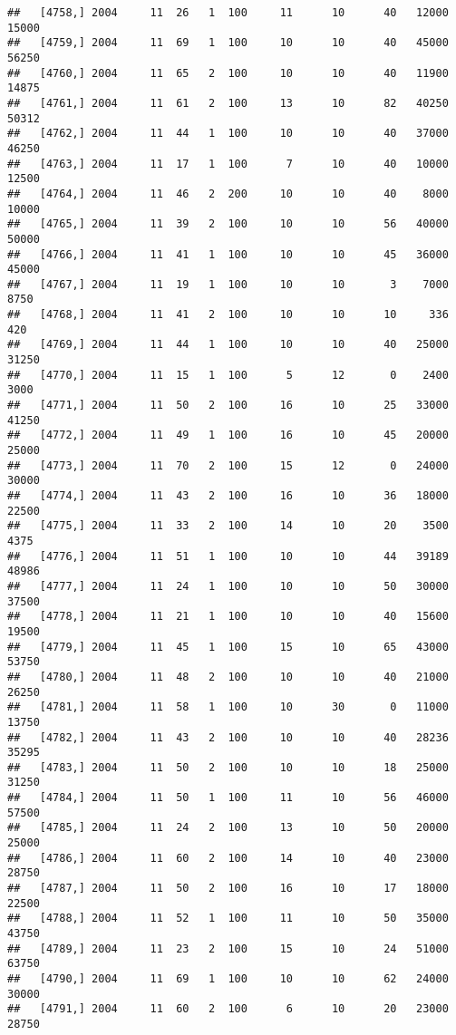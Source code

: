 \documentclass{article}\usepackage[]{graphicx}\usepackage[]{color}
\makeatletter
\newenvironment{kframe}{%
 \def\at@end@of@kframe{}%
 \ifinner\ifhmode%
  \def\at@end@of@kframe{\end{minipage}}%
  \begin{minipage}{\columnwidth}%
 \fi\fi%
 \def\FrameCommand##1{\hskip\@totalleftmargin \hskip-\fboxsep
 \colorbox{shadecolor}{##1}\hskip-\fboxsep
     \hskip-\linewidth \hskip-\@totalleftmargin \hskip\columnwidth}%
 \MakeFramed {\advance\hsize-\width
   \@totalleftmargin\z@ \linewidth\hsize
   \@setminipage}}%
 {\par\unskip\endMakeFramed%
 \at@end@of@kframe}
\newenvironment{knitrout}{}{} %
\makeatother
\begin{document}
\begin{knitrout}
\begin{kframe}
\begin{verbatim}
##   [4758,] 2004     11  26   1  100     11      10      40   12000   15000
##   [4759,] 2004     11  69   1  100     10      10      40   45000   56250
##   [4760,] 2004     11  65   2  100     10      10      40   11900   14875
##   [4761,] 2004     11  61   2  100     13      10      82   40250   50312
##   [4762,] 2004     11  44   1  100     10      10      40   37000   46250
##   [4763,] 2004     11  17   1  100      7      10      40   10000   12500
##   [4764,] 2004     11  46   2  200     10      10      40    8000   10000
##   [4765,] 2004     11  39   2  100     10      10      56   40000   50000
##   [4766,] 2004     11  41   1  100     10      10      45   36000   45000
##   [4767,] 2004     11  19   1  100     10      10       3    7000    8750
##   [4768,] 2004     11  41   2  100     10      10      10     336     420
##   [4769,] 2004     11  44   1  100     10      10      40   25000   31250
##   [4770,] 2004     11  15   1  100      5      12       0    2400    3000
##   [4771,] 2004     11  50   2  100     16      10      25   33000   41250
##   [4772,] 2004     11  49   1  100     16      10      45   20000   25000
##   [4773,] 2004     11  70   2  100     15      12       0   24000   30000
##   [4774,] 2004     11  43   2  100     16      10      36   18000   22500
##   [4775,] 2004     11  33   2  100     14      10      20    3500    4375
##   [4776,] 2004     11  51   1  100     10      10      44   39189   48986
##   [4777,] 2004     11  24   1  100     10      10      50   30000   37500
##   [4778,] 2004     11  21   1  100     10      10      40   15600   19500
##   [4779,] 2004     11  45   1  100     15      10      65   43000   53750
##   [4780,] 2004     11  48   2  100     10      10      40   21000   26250
##   [4781,] 2004     11  58   1  100     10      30       0   11000   13750
##   [4782,] 2004     11  43   2  100     10      10      40   28236   35295
##   [4783,] 2004     11  50   2  100     10      10      18   25000   31250
##   [4784,] 2004     11  50   1  100     11      10      56   46000   57500
##   [4785,] 2004     11  24   2  100     13      10      50   20000   25000
##   [4786,] 2004     11  60   2  100     14      10      40   23000   28750
##   [4787,] 2004     11  50   2  100     16      10      17   18000   22500
##   [4788,] 2004     11  52   1  100     11      10      50   35000   43750
##   [4789,] 2004     11  23   2  100     15      10      24   51000   63750
##   [4790,] 2004     11  69   1  100     10      10      62   24000   30000
##   [4791,] 2004     11  60   2  100      6      10      20   23000   28750

\end{verbatim}
\end{kframe}
\end{knitrout}
\end{document}
